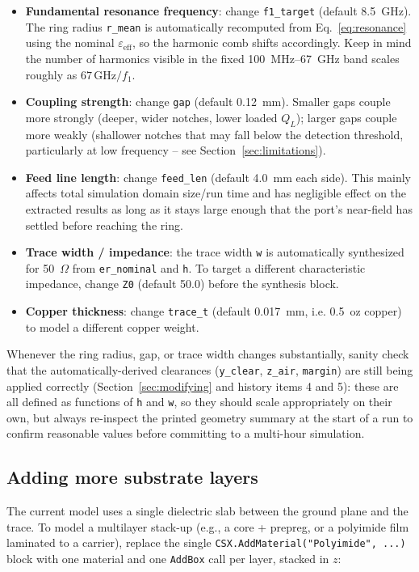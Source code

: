 \documentclass[11pt]{article}
\begin{document}
\begin{itemize}[leftmargin=*]
\item \textbf{Fundamental resonance frequency}: change \texttt{f1\_target}
(default 8.5~GHz). The ring radius \texttt{r\_mean} is automatically
recomputed from Eq.~\ref{eq:resonance} using the nominal
$\varepsilon_{\mathrm{eff}}$, so the harmonic comb shifts accordingly. Keep
in mind the number of harmonics visible in the fixed 100~MHz--67~GHz band
scales roughly as $67\,\mathrm{GHz}/f_1$.
\item \textbf{Coupling strength}: change \texttt{gap} (default 0.12~mm).
Smaller gaps couple more strongly (deeper, wider notches, lower loaded
$Q_L$); larger gaps couple more weakly (shallower notches that may fall
below the detection threshold, particularly at low frequency -- see
Section~\ref{sec:limitations}).
\item \textbf{Feed line length}: change \texttt{feed\_len} (default 4.0~mm
each side). This mainly affects total simulation domain size/run time and
has negligible effect on the extracted results as long as it stays large
enough that the port's near-field has settled before reaching the ring.
\item \textbf{Trace width / impedance}: the trace width \texttt{w} is
automatically synthesized for 50~$\Omega$ from \texttt{er\_nominal} and
\texttt{h}. To target a different characteristic impedance, change
\texttt{Z0} (default 50.0) before the synthesis block.
\item \textbf{Copper thickness}: change \texttt{trace\_t} (default
0.017~mm, i.e. 0.5~oz copper) to model a different copper weight.
\end{itemize}

Whenever the ring radius, gap, or trace width changes substantially, sanity
check that the automatically-derived clearances
(\texttt{y\_clear}, \texttt{z\_air}, \texttt{margin}) are still being applied
correctly (Section~\ref{sec:modifying} and history items 4 and 5): these are
all defined as functions of \texttt{h} and \texttt{w}, so they should scale
appropriately on their own, but always re-inspect the printed geometry
summary at the start of a run to confirm reasonable values before committing
to a multi-hour simulation.

\subsection{Adding more substrate layers}

The current model uses a single dielectric slab between the ground plane
and the trace. To model a multilayer stack-up (e.g., a core + prepreg, or a
polyimide film laminated to a carrier), replace the single
\texttt{CSX.AddMaterial("Polyimide", ...)} block with one material and one
\texttt{AddBox} call per layer, stacked in $z$:
\end{document}
